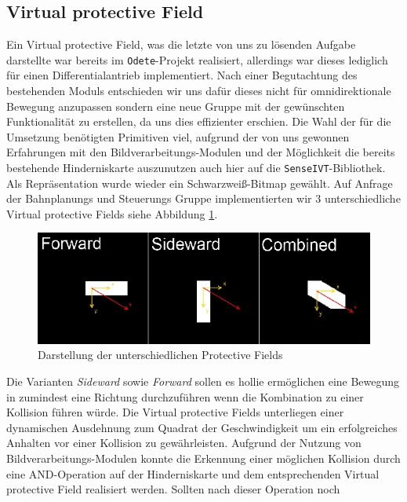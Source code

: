 \subsection{Virtual protective Field}
\label{sec:vpf}
Ein Virtual protective Field, was die letzte von uns zu lösenden Aufgabe
darstellte war bereits im \lstinline{Odete}-Projekt realisiert,
 allerdings war dieses lediglich für einen Differentialantrieb implementiert.
 Nach einer Begutachtung des bestehenden Moduls entschieden wir uns dafür
 dieses nicht für omnidirektionale Bewegung anzupassen sondern eine neue Gruppe mit der gewünschten Funktionalität
 zu erstellen, da uns dies effizienter erschien. Die Wahl der für die Umsetzung benötigten Primitiven viel, aufgrund
 der von uns gewonnen Erfahrungen mit den Bildverarbeitungs-Modulen und der Möglichkeit die bereits bestehende
 Hinderniskarte auszunutzen auch hier auf die \lstinline{SenseIVT}-Bibliothek.
 Als Repräsentation wurde wieder ein Schwarzweiß-Bitmap gewählt. Auf Anfrage der
 Bahnplanungs und Steuerungs Gruppe implementierten wir 3 unterschiedliche
 Virtual protective Fields siehe Abbildung \ref{fig:virtualprotectivefields}.
 \begin{figure}[h]
\center
\includegraphics[scale=0.5]{graphics/virtualprotectivefields.jpg}
\caption{\label{fig:virtualprotectivefields} Darstellung der unterschiedlichen Protective
Fields}
\end{figure}
 Die Varianten \emph{Sideward} sowie \emph{Forward} sollen es \gls{hollie}
 ermöglichen eine Bewegung in zumindest eine Richtung durchzuführen wenn die Kombination zu einer Kollision führen würde.
 Die Virtual protective Fields unterliegen einer dynamischen Ausdehnung zum
 Quadrat der Geschwindigkeit um ein erfolgreiches Anhalten vor einer Kollision zu gewährleisten. Aufgrund der Nutzung von Bildverarbeitungs-Modulen
 konnte die Erkennung einer möglichen Kollision durch eine AND-Operation auf der Hinderniskarte und dem entsprechenden
 Virtual protective Field realisiert werden. Sollten nach dieser Operation noch
